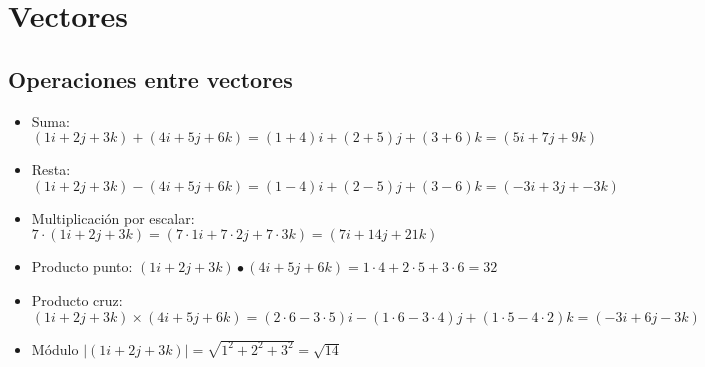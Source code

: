 \section{Vectores}
\subsection*{Operaciones entre vectores}

\begin{itemize}[left=0cm]
\item Suma: $(1i + 2j + 3k) + (4i + 5j + 6k) = (1 + 4)i + (2+5)j + (3+6)k = (5i + 7j + 9k)$

\item Resta: $(1i + 2j + 3k) - (4i + 5j + 6k) = (1 - 4)i + (2-5)j + (3-6)k = (-3i + 3j + -3k)$

\item Multiplicación por escalar: $7\cdot(1i + 2j + 3k) = (7\cdot 1i + 7 \cdot 2j + 7\cdot 3k) = (7i + 14j + 21k)$

\item Producto punto: $(1i + 2j + 3k) \bullet (4i + 5j + 6k) = 1\cdot 4 + 2\cdot 5 + 3\cdot 6 = 32$

\item Producto cruz: $(1i + 2j + 3k) \times (4i + 5j + 6k) = (2\cdot 6 - 3\cdot 5)i - (1 \cdot 6 - 3\cdot 4)j + (1 \cdot 5 - 4 \cdot 2)k = (-3i +6j -3k)$

\item Módulo $\big|(1i + 2j + 3k)\big| = \sqrt{1^2 + 2^2 + 3^2} = \sqrt{14}$
\end{itemize}
